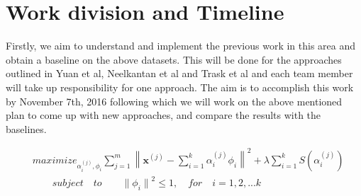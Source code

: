 \documentclass{article}
\newcommand{\norm}[1]{\left\lVert#1\right\rVert}
\begin{document}
\section{Work division and Timeline}
Firstly, we aim to understand and implement the previous work in this area and obtain a baseline on the above datasets. This will be done for the approaches outlined in Yuan et al\cite{yuan2016word}, Neelkantan et al\cite{neelakantan2015efficient} and Trask et al\cite{trask2015sense2vec} and each team member will take up responsibility for one approach. The aim is to accomplish this work by November 7th, 2016 following which we will work on the above mentioned plan to come up with new approaches, and compare the results with the baselines.




\begin{equation}\label{eq:perceptron}
\begin{split}
& maximize_{{\alpha_i^{(j)}}, {\phi_i}} \sum_{j=1}^m \norm{ {\mathbf{x}^{(j)}} - {\sum_{i=1}^k {{\alpha_i^{(j)}}{\phi_i}}} }^2 + \lambda{\sum_{i=1}^k S(\alpha_i^{(j)})}  \\
& \quad\quad{subject\quad{to}} \qquad {\lVert \phi_i \rVert}^2 \leq 1,\quad for\quad i = 1,2,...k
\end{split}
\end{equation}

\pagebreak
\nocite{*}

\end{document}
